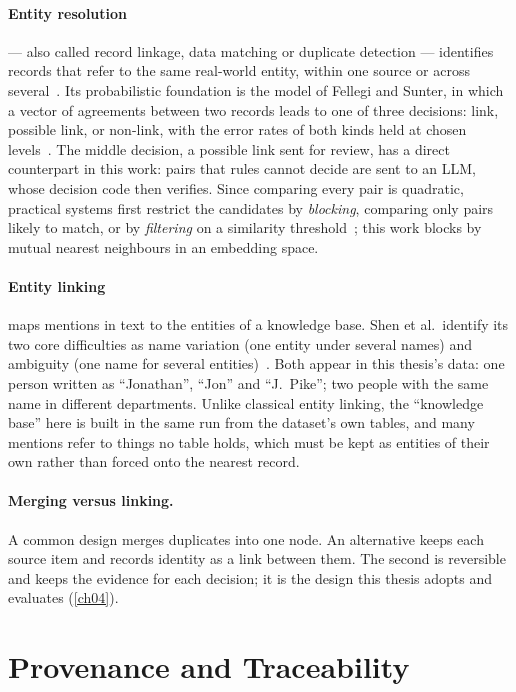 \paragraph{Entity resolution} --- also called record linkage, data matching or duplicate detection --- identifies
records that refer to the same real-world entity, within one source or across several~\cite{christen2012data}.
Its probabilistic foundation is the model of Fellegi and Sunter, in which a vector of agreements between two
records leads to one of three decisions: link, possible link, or non-link, with the error rates of both kinds
held at chosen levels~\cite{fellegi1969theory}. The middle decision, a possible link sent for review, has a
direct counterpart in this work: pairs that rules cannot decide are sent to an LLM, whose decision code then
verifies. Since comparing every pair is quadratic, practical systems first restrict the candidates by
\emph{blocking}, comparing only pairs likely to match, or by \emph{filtering} on a similarity
threshold~\cite{papadakis2020blocking}; this work blocks by mutual nearest neighbours in an embedding space.

\paragraph{Entity linking} maps mentions in text to the entities of a knowledge base. Shen et al.\ identify its
two core difficulties as name variation (one entity under several names) and ambiguity (one name for several
entities)~\cite{shen2015entity}. Both appear in this thesis's data: one person written as ``Jonathan'', ``Jon''
and ``J.~Pike''; two people with the same name in different departments. Unlike classical entity linking, the
``knowledge base'' here is built in the same run from the dataset's own tables, and many mentions refer to
things no table holds, which must be kept as entities of their own rather than forced onto the nearest record.

\paragraph{Merging versus linking.} A common design merges duplicates into one node. An alternative keeps each
source item and records identity as a link between them. The second is reversible and keeps the evidence for
each decision; it is the design this thesis adopts and evaluates (\cref{ch04}).

\section{Provenance and Traceability}\label{sec:ch02-provenance-and-traceability}

